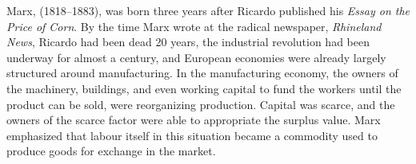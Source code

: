 Marx, (1818--1883), was born three years after Ricardo published his \textit{Essay on the Price of Corn}. By the time Marx wrote %
at the radical newspaper, \textit{Rhineland News}, Ricardo had been dead 20 years, the industrial revolution had been underway for almost a century, and European economies were already largely structured around manufacturing. 
 In the manufacturing economy, the owners of the machinery, buildings, and even working capital to fund the workers until the product can be sold, were reorganizing production. Capital was scarce, and the owners of the scarce factor were able to appropriate the surplus value. %
Marx emphasized that labour itself in this situation  became a commodity used to produce goods for exchange in the market. %

